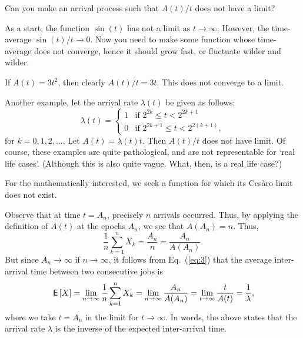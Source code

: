 \begin{exercise}
  Can you make an arrival process such that $A(t)/t$ does not have a
  limit?  
  \begin{hint}
As a start, the function $\sin(t)$ has not a limit as
    $t\to\infty$. However, the time-average $\sin(t)/t \to 0$.  Now
    you need to make some function whose time-average does not
    converge, hence it should grow fast, or fluctuate wilder and
    wilder.
  \end{hint}
  \begin{solution}
 If $A(t) = 3 t^2$, then clearly $A(t)/t = 3t$. This does not
    converge to a limit. 

  Another example, let the arrival rate $\lambda(t)$ be given as
    follows:
    \begin{equation*}
      \lambda(t) = 
    \begin{cases}
      1 & \text{if } 2^{2k} \leq t < 2^{2k+1} \\
      0 & \text{if } 2^{2k+1} \leq t < 2^{2(k+1)},
    \end{cases}
    \end{equation*}
    for $k=0,1,2,\ldots$. Let $A(t) = \lambda(t) t$. Then $A(t)/t$
    does not have limit. Of course, these examples are quite
    pathological, and are not representable for `real life cases'.
    (Although this is also quite vague. What, then, is a real life
    case?)

For the mathematically interested, we seek a
    function for which its Ces\`aro limit does not exist.
  \end{solution}
\end{exercise}



Observe that at time $t=A_n$, precisely $n$ arrivals occurred. Thus,
by applying the definition of $A(t)$ at the epochs $A_n$, we see that
$A(A_n) = n$. Thus,
\begin{equation*}
  \frac{1}n\sum_{k=1}^n X_k = \frac{A_n}n = \frac{A_n}{A(A_n)}. 
\end{equation*}
But since $A_n\to\infty$ if $n\to\infty$, it follows from
Eq.~(\ref{eq:3}) that the average inter-arrival time between two
consecutive jobs is
\begin{equation}\label{eq:54}
  \,\mathsf{E}\left[X\right] = \lim_{n\to\infty}  \frac{1}n\sum_{k=1}^n X_k = \lim_{n\to \infty} \frac{A_n}{A(A_n)} = \lim_{t\to\infty} \frac t{A(t)} = \frac 1 \lambda,
\end{equation}
where we take $t=A_n$ in the limit for $t\to\infty$.  In words, the
above states that the arrival rate $\lambda$ is the inverse of the
expected inter-arrival time.


